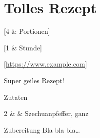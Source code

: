 \section{Tolles Rezept}\label{rcp:tolles-rezept}


\begin{recipeintro}
  [4 & Portionen]

  [1 & Stunde]

  [\url{https://www.example.com}]

  Super geiles Rezept!
\end{recipeintro}

\begin{ingredients}
  {Zutaten}

  2                &  \si{\tl}           &  Szechuanpfeffer, ganz  \\


\end{ingredients}

\vspace{0.5cm}

\begin{recipestep}
  {Zubereitung}
  Bla bla bla\ldots
\end{recipestep}
